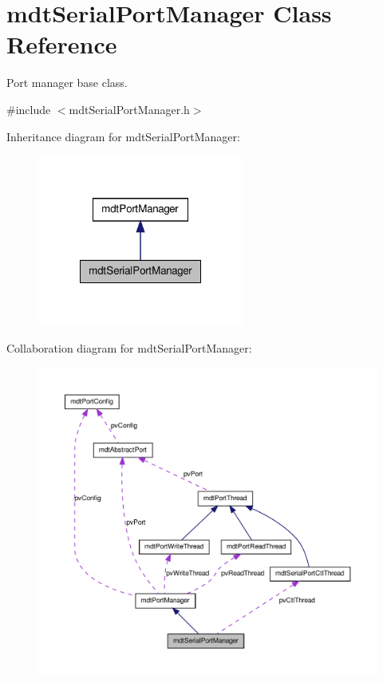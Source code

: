 \hypertarget{classmdt_serial_port_manager}{
\section{mdtSerialPortManager Class Reference}
\label{classmdt_serial_port_manager}
}


Port manager base class.  




{\ttfamily \#include $<$mdtSerialPortManager.h$>$}



Inheritance diagram for mdtSerialPortManager:\nopagebreak
\begin{figure}[H]
\begin{center}
\leavevmode
\includegraphics[width=192pt]{classmdt_serial_port_manager__inherit__graph}
\end{center}
\end{figure}


Collaboration diagram for mdtSerialPortManager:
\nopagebreak
\begin{figure}[H]
\begin{center}
\leavevmode
\includegraphics[width=400pt]{classmdt_serial_port_manager__coll__graph}
\end{center}
\end{figure}
